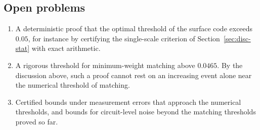 \documentclass[11pt]{amsart}
\theoremstyle{definition}
\theoremstyle{remark}
\numberwithin{equation}{section}
\begin{document}
\subsection{Open problems}
\begin{enumerate}[label=(\arabic*),leftmargin=2em]
\item A deterministic proof that the optimal threshold of the surface code exceeds $0.05$, for instance by certifying the single-scale criterion of Section~\ref{sec:disc-stat} with exact arithmetic.
\item A rigorous threshold for minimum-weight matching above $0.0465$. By the discussion above, such a proof cannot rest on an increasing event alone near the numerical threshold of matching.
\item Certified bounds under measurement errors that approach the numerical thresholds, and bounds for circuit-level noise beyond the matching thresholds proved so far.
\end{enumerate}
\end{document}
